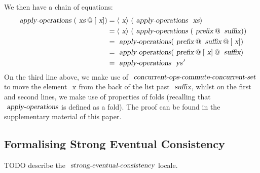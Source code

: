 We then have a chain of equations:
{\small{\begin{align*}
  \isa{apply-operations}\ (\isa{xs} \mathbin{@} [\isa{x}])
  &= \langle\isa{x}\rangle\ (\isa{apply-operations}\ \isa{xs}) \\
  &= \langle\isa{x}\rangle\ (\isa{apply-operations}\ (\isa{prefix} \mathbin{@} \isa{suffix})) \\
  &= \isa{apply-operations} (\isa{prefix} \mathbin{@} \isa{suffix} \mathbin{@} [\isa{x}]) \\
  &= \isa{apply-operations} (\isa{prefix} \mathbin{@} [\isa{x}] \mathbin{@} \isa{suffix}) \\
  &= \isa{apply-operations}\ \isa{ys}{\isacharprime}
\end{align*}}}
On the third line above, we make use of $\isa{concurrent-ops-commute-concurrent-set}$ to move the element $\isa{x}$ from the back of the list past $\isa{suffix}$, whilst on the first and second lines, we make use of properties of folds (recalling that $\isa{apply-operations}$ is defined as a fold).
\else
The proof can be found in the supplementary material of this paper.
\fi

\subsection{Formalising Strong Eventual Consistency}

TODO describe the $\isa{strong-eventual-consistency}$ locale.
